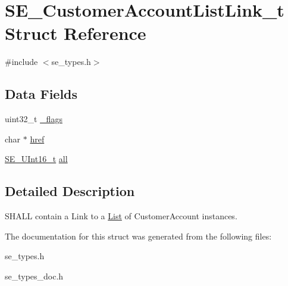 \hypertarget{structSE__CustomerAccountListLink__t}{}\section{S\+E\+\_\+\+Customer\+Account\+List\+Link\+\_\+t Struct Reference}
\label{structSE__CustomerAccountListLink__t}


{\ttfamily \#include $<$se\+\_\+types.\+h$>$}

\subsection*{Data Fields}
\begin{DoxyCompactItemize}
\item 
uint32\+\_\+t \hyperlink{group__CustomerAccountListLink_ga01fd3aae6915060506e74a3ef840eaaf}{\+\_\+flags}
\item 
char $\ast$ \hyperlink{group__CustomerAccountListLink_ga42b5e2091d750acc99f8b6d3d8b57283}{href}
\item 
\hyperlink{group__UInt16_gac68d541f189538bfd30cfaa712d20d29}{S\+E\+\_\+\+U\+Int16\+\_\+t} \hyperlink{group__CustomerAccountListLink_ga3c03b4479a40a58a6184085922237ae1}{all}
\end{DoxyCompactItemize}


\subsection{Detailed Description}
S\+H\+A\+LL contain a Link to a \hyperlink{structList}{List} of Customer\+Account instances. 

The documentation for this struct was generated from the following files\+:\begin{DoxyCompactItemize}
\item 
se\+\_\+types.\+h\item 
se\+\_\+types\+\_\+doc.\+h\end{DoxyCompactItemize}
